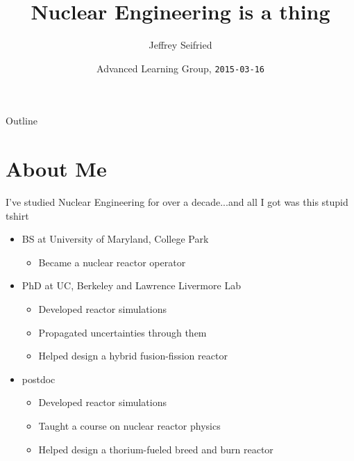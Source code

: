 \documentclass{beamer}
\title{Nuclear Engineering is a thing}
\author{Jeffrey Seifried}
\institute{Ad Delivery Team, Yelp}
\date{Advanced Learning Group, \texttt{2015-03-16}}
\begin{document}
\begin{frame}
  \titlepage
\end{frame}

\begin{frame}{Outline}
  \tableofcontents
\end{frame}


\section{About Me}

    \begin{frame}{I've studied Nuclear Engineering for over a decade}{...and all I got was this stupid tshirt}

        \begin{itemize}

            \item BS at University of Maryland, College Park
            \begin{itemize}
                \item Became a nuclear reactor operator
            \end{itemize}

            \pause

            \item PhD at UC, Berkeley and Lawrence Livermore Lab
            \begin{itemize}
                \item Developed reactor simulations
                \item Propagated uncertainties through them
                \item Helped design a hybrid fusion-fission reactor
            \end{itemize}

            \pause

            \item postdoc
            \begin{itemize}
                \item Developed reactor simulations
                \item Taught a course on nuclear reactor physics
                \item Helped design a thorium-fueled breed and burn reactor
            \end{itemize}
        \end{itemize}

    \end{frame}
\end{document}
